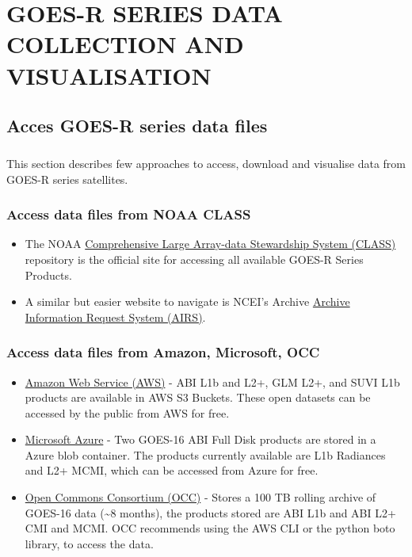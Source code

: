 \chapter{\normalsize{ GOES-R SERIES DATA COLLECTION AND VISUALISATION}}
\section{Acces GOES-R series data files}
\paragraph{}
This section describes few approaches to access, download  and visualise data from GOES-R series satellites.
\subsection{Access data files from NOAA CLASS}
\begin{itemize} 
\item The NOAA \href{https://www.avl.class.noaa.gov/saa/products/welcome}{Comprehensive Large Array-data Stewardship System (CLASS)} repository is the official site for accessing all available GOES-R Series Products.
\item  A similar but easier website to navigate is NCEI's Archive \href{https://www.ncdc.noaa.gov/airs-web/search}{Archive Information Request System (AIRS)}.
\end{itemize}
\subsection{Access data files from Amazon, Microsoft, OCC}
\begin{itemize}
\item \href{https://registry.opendata.aws/noaa-goes/}{Amazon Web Service (AWS)} - ABI L1b and L2+, GLM L2+, and SUVI L1b products are available in AWS S3 Buckets. These open datasets can be accessed by the public from AWS for free. 
\item \href{https://azure.microsoft.com/en-us/services/open-datasets/catalog/goes-16/}{Microsoft Azure}  - Two GOES-16 ABI Full Disk products are stored in a Azure blob container. 
The products currently available are L1b Radiances and L2+ MCMI, which can be accessed from Azure for free.
\item  \href{http://edc.occ-data.org/goes16/}{Open Commons Consortium (OCC)} - Stores a 100 TB rolling archive of GOES-16 data (\~{}8 months), the products stored are ABI L1b and ABI L2+ CMI and MCMI. OCC recommends using the AWS CLI or the python boto library, to access the data. 
\end{itemize}
